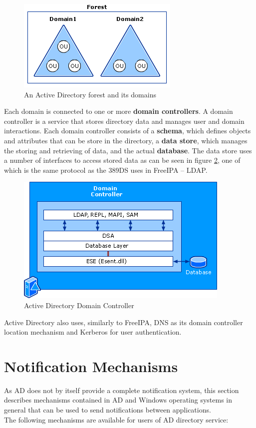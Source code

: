 \begin{figure}[!ht]
    \centering
        \includegraphics[scale=0.6]{fig/AD-forest}
    \caption{An Active Directory forest and its domains \cite{ADoverview}}
    \label{fig:adForest}
\end{figure}

Each domain is connected to one or more \textbf{domain controllers}. A domain controller is a service that stores directory data and manages user and domain interactions.
Each domain controller consists of a \textbf{schema}, which defines objects and attributes that can be store in the directory, a \textbf{data store}, which manages the storing and retrieving of data, and the actual \textbf{database}.
The data store uses a number of interfaces to access stored data as can be seen in figure \ref{fig:adController}, one of which is the same protocol as the 389DS uses in FreeIPA -- LDAP.

\begin{figure}[!ht]
    \centering
        \includegraphics[scale=0.6]{fig/AD-controller}
    \caption{Active Directory Domain Controller \cite{ADoverview}}
    \label{fig:adController}
\end{figure}

Active Directory also uses, similarly to FreeIPA, DNS as its domain controller location mechanism and Kerberos for user authentication.

\FloatBarrier
\section{Notification Mechanisms}
\label{sec:adNotif}
As AD does not by itself provide a complete notification system, this section describes mechanisms contained in AD and Windows operating systems in general that can be used to send notifications between applications. \\
The following mechanisms are available for users of AD directory service:

